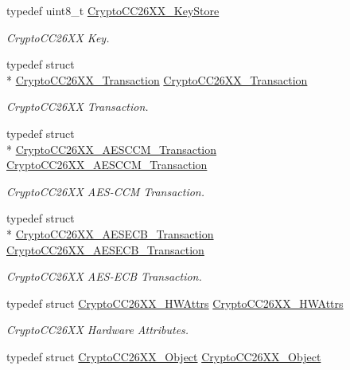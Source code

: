 \begin{DoxyCompactItemize}
typedef uint8\-\_\-t \hyperlink{_crypto_c_c26_x_x_8h_a30e647b6ad6b608b60990929200686e0}{Crypto\-C\-C26\-X\-X\-\_\-\-Key\-Store}
\begin{DoxyCompactList}\small\item\em Crypto\-C\-C26\-X\-X Key. \end{DoxyCompactList}\item 
typedef struct \\*
\hyperlink{struct_crypto_c_c26_x_x___transaction}{Crypto\-C\-C26\-X\-X\-\_\-\-Transaction} \hyperlink{_crypto_c_c26_x_x_8h_a7d5a6e41436163786d2e01c0122a3de7}{Crypto\-C\-C26\-X\-X\-\_\-\-Transaction}
\begin{DoxyCompactList}\small\item\em Crypto\-C\-C26\-X\-X Transaction. \end{DoxyCompactList}\item 
typedef struct \\*
\hyperlink{struct_crypto_c_c26_x_x___a_e_s_c_c_m___transaction}{Crypto\-C\-C26\-X\-X\-\_\-\-A\-E\-S\-C\-C\-M\-\_\-\-Transaction} \hyperlink{_crypto_c_c26_x_x_8h_a9cf6019bce243720cebc70eb8310682e}{Crypto\-C\-C26\-X\-X\-\_\-\-A\-E\-S\-C\-C\-M\-\_\-\-Transaction}
\begin{DoxyCompactList}\small\item\em Crypto\-C\-C26\-X\-X A\-E\-S-\/\-C\-C\-M Transaction. \end{DoxyCompactList}\item 
typedef struct \\*
\hyperlink{struct_crypto_c_c26_x_x___a_e_s_e_c_b___transaction}{Crypto\-C\-C26\-X\-X\-\_\-\-A\-E\-S\-E\-C\-B\-\_\-\-Transaction} \hyperlink{_crypto_c_c26_x_x_8h_a49f5f56e3a3f2f1aa354067e4261533f}{Crypto\-C\-C26\-X\-X\-\_\-\-A\-E\-S\-E\-C\-B\-\_\-\-Transaction}
\begin{DoxyCompactList}\small\item\em Crypto\-C\-C26\-X\-X A\-E\-S-\/\-E\-C\-B Transaction. \end{DoxyCompactList}\item 
typedef struct \hyperlink{struct_crypto_c_c26_x_x___h_w_attrs}{Crypto\-C\-C26\-X\-X\-\_\-\-H\-W\-Attrs} \hyperlink{_crypto_c_c26_x_x_8h_a43b8004f918cfc847b65ebe981970da7}{Crypto\-C\-C26\-X\-X\-\_\-\-H\-W\-Attrs}
\begin{DoxyCompactList}\small\item\em Crypto\-C\-C26\-X\-X Hardware Attributes. \end{DoxyCompactList}\item 
typedef struct \hyperlink{struct_crypto_c_c26_x_x___object}{Crypto\-C\-C26\-X\-X\-\_\-\-Object} \hyperlink{_crypto_c_c26_x_x_8h_a1d3ce506f41ca09dbb4fc02615c54d4e}{Crypto\-C\-C26\-X\-X\-\_\-\-Object}

\end{DoxyCompactItemize}
